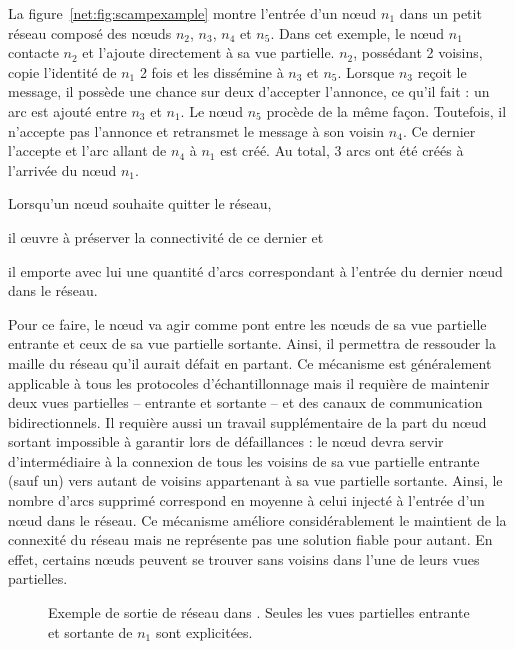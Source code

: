 \noindent La figure~\ref{net:fig:scampexample} montre l'entrée d'un nœud $n_1$
dans un petit réseau \SCAMP composé des nœuds $n_2$, $n_3$, $n_4$ et $n_5$. Dans
cet exemple, le nœud $n_1$ contacte $n_2$ et l'ajoute directement à sa vue
partielle. $n_2$, possédant 2 voisins, copie l'identité de $n_1$ 2 fois et les
dissémine à $n_3$ et $n_5$. Lorsque $n_3$ reçoit le message, il possède une
chance sur deux d'accepter l'annonce, ce qu'il fait : un arc est ajouté entre
$n_3$ et $n_1$. Le nœud $n_5$ procède de la même façon. Toutefois, il n'accepte
pas l'annonce et retransmet le message à son voisin $n_4$. Ce dernier l'accepte
et l'arc allant de $n_4$ à $n_1$ est créé. Au total, 3 arcs ont été créés à
l'arrivée du nœud $n_1$.


\noindent Lorsqu'un nœud souhaite quitter le réseau,
\begin{inparaenum}[(i)]
\item il œuvre à préserver la connectivité de ce dernier et
\item il emporte avec lui une quantité d'arcs correspondant à l'entrée du
  dernier nœud dans le réseau.
\end{inparaenum}
Pour ce faire, le nœud va agir comme pont entre les nœuds de sa vue partielle
entrante et ceux de sa vue partielle sortante. Ainsi, il permettra de ressouder
la maille du réseau qu'il aurait défait en partant. Ce mécanisme est
généralement applicable à tous les protocoles d'échantillonnage mais il requière
de maintenir deux vues partielles -- entrante et sortante -- et des canaux de
communication bidirectionnels. Il requière aussi un travail supplémentaire de la
part du nœud sortant impossible à garantir lors de défaillances : le nœud devra
servir d'intermédiaire à la connexion de tous les voisins de sa vue partielle
entrante (sauf un) vers autant de voisins appartenant à sa vue partielle
sortante. Ainsi, le nombre d'arcs supprimé correspond en moyenne à celui injecté
à l'entrée d'un nœud dans le réseau. Ce mécanisme améliore considérablement le
maintient de la connexité du réseau mais ne représente pas une solution fiable
pour autant. En effet, certains nœuds peuvent se trouver sans voisins dans l'une
de leurs vues partielles.
  

\begin{figure}
  \centering
  \hspace{45pt}
  \caption[Protocole de sortie dans \SCAMP]
  {\label{net:fig:scampexample2} Exemple de sortie de réseau dans \SCAMP. Seules
    les vues partielles entrante et sortante de $n_1$ sont explicitées.}
\end{figure}

